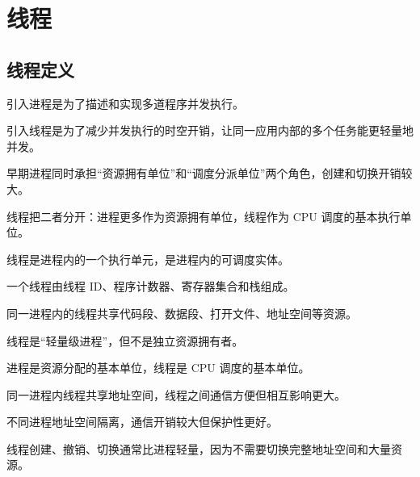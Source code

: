 \chapter{线程}

\section{线程定义}
\begin{points}
  \item 引入进程是为了描述和实现多道程序并发执行。
  \item 引入线程是为了减少并发执行的时空开销，让同一应用内部的多个任务能更轻量地并发。
  \item 早期进程同时承担“资源拥有单位”和“调度分派单位”两个角色，创建和切换开销较大。
  \item 线程把二者分开：进程更多作为资源拥有单位，线程作为 CPU 调度的基本执行单位。
\end{points}


\begin{points}
  \item 线程是进程内的一个执行单元，是进程内的可调度实体。
  \item 一个线程由线程 ID、程序计数器、寄存器集合和栈组成。
  \item 同一进程内的线程共享代码段、数据段、打开文件、地址空间等资源。
  \item 线程是“轻量级进程”，但不是独立资源拥有者。
\end{points}


\begin{points}
  \item 进程是资源分配的基本单位，线程是 CPU 调度的基本单位。
  \item 同一进程内线程共享地址空间，线程之间通信方便但相互影响更大。
  \item 不同进程地址空间隔离，通信开销较大但保护性更好。
  \item 线程创建、撤销、切换通常比进程轻量，因为不需要切换完整地址空间和大量资源。
\end{points}


